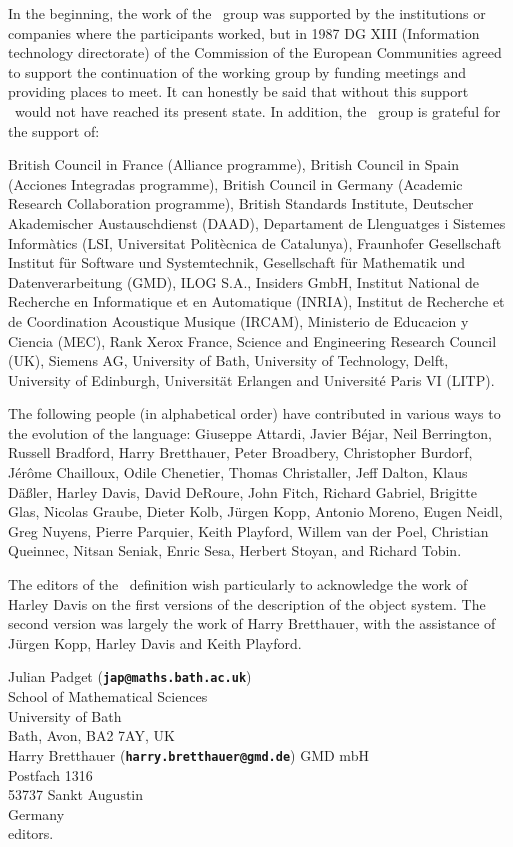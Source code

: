 \begin{foreword}
\begin{optDefinition}
In the beginning, the work of the \eulisp\ group was supported by the
institutions or companies where the participants worked, but in 1987 DG XIII
(Information technology directorate) of the Commission of the European
Communities agreed to support the continuation of the working group by funding
meetings and providing places to meet.  It can honestly be said that without
this support \eulisp\ would not have reached its present state.  In addition,
the \eulisp\ group is grateful for the support of:

British Council in France (Alliance programme),
British Council in Spain (Acciones Integradas programme),
British Council in Germany (Academic Research Collaboration programme),
British Standards Institute,
Deutscher Akademischer Austauschdienst (DAAD),
Departament de Llenguatges i Sistemes Inform\`atics (LSI, Universitat
Polit\`ecnica de Catalunya),
Fraunhofer Gesellschaft Institut f\"ur Software und Systemtechnik,
Gesellschaft f\"ur Mathematik und Datenverarbeitung (GMD),
ILOG S.A.,
Insiders GmbH,
Institut National de Recherche en Informatique et en Automatique (INRIA),
Institut de Recherche et de Coordination Acoustique Musique (IRCAM),
Ministerio de Educacion y Ciencia (MEC),
Rank Xerox France,
Science and Engineering Research Council (UK),
Siemens AG,
University of Bath,
University of Technology, Delft,
University of Edinburgh,
Universit\"at Erlangen
and
Universit\'e Paris VI (LITP).

The following people (in alphabetical order) have contributed in
various ways to the evolution of the language:
Giuseppe Attardi,
Javier B\'ejar,
Neil Berrington,
Russell Bradford,
Harry Bretthauer,
Peter Broadbery,
Christopher Burdorf,
J\'er\^ome Chailloux,
Odile Chenetier,
Thomas Christaller,
Jeff Dalton,
Klaus D\"a{\ss}ler,
Harley Davis,
David DeRoure,
John Fitch,
Richard Gabriel,
Brigitte Glas,
Nicolas Graube,
Dieter Kolb,
J\"urgen Kopp,
Antonio Moreno,
Eugen Neidl,
Greg Nuyens,
Pierre Parquier,
Keith Playford,
Willem van der Poel,
Christian Queinnec,
Nitsan Seniak,
Enric Sesa,
Herbert Stoyan,
and
Richard Tobin.

The editors of the \eulisp\ definition wish particularly to acknowledge the work
of Harley Davis on the first versions of the description of the object system.
The second version was largely the work of Harry Bretthauer, with the assistance
of J\"urgen Kopp, Harley Davis and Keith Playford.

Julian Padget ({\bf \tt jap@maths.bath.ac.uk})\\
School of Mathematical Sciences\\
University of Bath\\
Bath, Avon, BA2 7AY, UK\\

\noindent
Harry Bretthauer ({\bf \tt harry.bretthauer@gmd.de})
GMD mbH\\
Postfach 1316\\
53737 Sankt Augustin\\
Germany\\

\noindent
editors.
\end{optDefinition}
\end{foreword}
